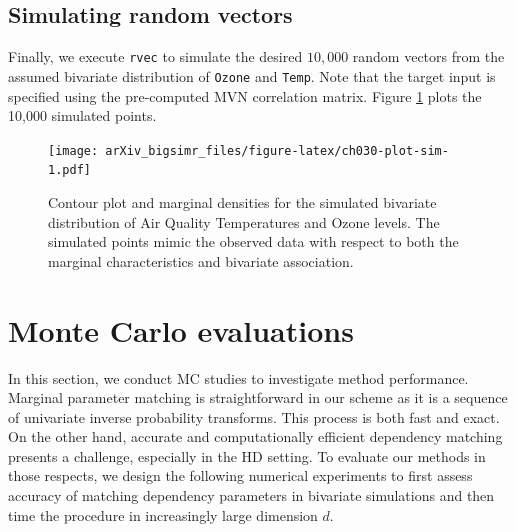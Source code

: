 \documentclass{article}
\newenvironment{Shaded}{\begin{snugshade}}{\end{snugshade}}
\newcommand{\DecValTok}[1]{\textcolor[rgb]{0.00,0.00,0.81}{#1}}
\newcommand{\FunctionTok}[1]{\textcolor[rgb]{0.00,0.00,0.00}{#1}}
\newcommand{\NormalTok}[1]{#1}
\newcommand{\OtherTok}[1]{\textcolor[rgb]{0.56,0.35,0.01}{#1}}
\newcommand{\SpecialCharTok}[1]{\textcolor[rgb]{0.00,0.00,0.00}{#1}}
\begin{document}
\hypertarget{simulating-random-vectors}{%
\subsection{Simulating random vectors}\label{simulating-random-vectors}}

Finally, we execute \texttt{rvec} to simulate the desired \(10,000\)
random vectors from the assumed bivariate distribution of \texttt{Ozone}
and \texttt{Temp}. Note that the target input is specified using the
pre-computed MVN correlation matrix. Figure \ref{fig:ch030-plot-sim}
plots the 10,000 simulated points.

\begin{Shaded}
\end{Shaded}

\begin{figure}
\centering
\texttt{[image: arXiv\_bigsimr\_files/figure-latex/ch030-plot-sim-1.pdf]}
\caption{\label{fig:ch030-plot-sim}Contour plot and marginal densities
for the simulated bivariate distribution of Air Quality Temperatures and
Ozone levels. The simulated points mimic the observed data with respect
to both the marginal characteristics and bivariate association.}
\end{figure}

\hypertarget{simulations}{%
\section{Monte Carlo evaluations}\label{simulations}}

In this section, we conduct MC studies to investigate method
performance. Marginal parameter matching is straightforward in our
scheme as it is a sequence of univariate inverse probability transforms.
This process is both fast and exact. On the other hand, accurate and
computationally efficient dependency matching presents a challenge,
especially in the HD setting. To evaluate our methods in those respects,
we design the following numerical experiments to first assess accuracy
of matching dependency parameters in bivariate simulations and then time
the procedure in increasingly large dimension \(d\).
\end{document}
